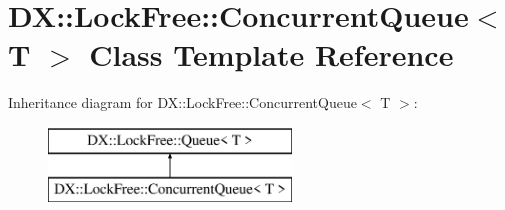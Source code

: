 \hypertarget{class_d_x_1_1_lock_free_1_1_concurrent_queue}{\section{D\-X\-:\-:Lock\-Free\-:\-:Concurrent\-Queue$<$ T $>$ Class Template Reference}
\label{class_d_x_1_1_lock_free_1_1_concurrent_queue}
}
Inheritance diagram for D\-X\-:\-:Lock\-Free\-:\-:Concurrent\-Queue$<$ T $>$\-:\begin{figure}[H]
\begin{center}
\leavevmode
\includegraphics[height=2.000000cm]{class_d_x_1_1_lock_free_1_1_concurrent_queue}
\end{center}
\end{figure}
